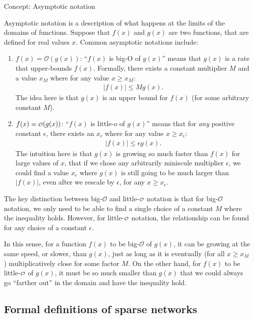 \begin{floatingbox}[h]\caption{Concept: Asymptotic notation}
\label{box:ch7:asy}
Asymptotic notation is a description of what happens at the limits of the domains of functions. Suppose that $f(x)$ and $g(x)$ are two functions, that are defined for real values $x$. Common asymptotic notations include:
\begin{enumerate}
    \item $f(x) = \mathcal O(g(x))$: ``$f(x)$ is big-O of $g(x)$'' means that $g(x)$ is a rate that upper-bounds $f(x)$. Formally, there exists a constant multiplier $M$ and a value $x_M$ where for any value $x \geq x_M$:
    \begin{align*}
        |f(x)| \leq Mg(x).
    \end{align*}
    The idea here is that $g(x)$ is an upper bound for $f(x)$ (for some arbitrary constant $M$).
    \item $f(x) = \smallO(g(x))$: ``$f(x)$ is little-o of $g(x)$'' means that for \textit{any} positive constant $\epsilon$, there exists an $x_\epsilon$ where for any value $x \geq x_\epsilon$:
    \begin{align*}
        |f(x)| \leq \epsilon g(x).
    \end{align*}
    The intuition here is that $g(x)$ is growing so much faster than $f(x)$ for large values of $x$, that if we chose any arbitrarily miniscule multiplier $\epsilon$, we could find a value $x_\epsilon$ where $g(x)$ is still going to be much larger than $|f(x)|$, even after we rescale by $\epsilon$, for any $x \geq x_{\epsilon}$.
\end{enumerate}
The key distinction between big-$\mathcal O$ and little-$\smallO$ notation is that for big-$\mathcal O$ notation, we only need to be able to find a single choice of a constant $M$ where the inequality holds. However, for little-$\smallO$ notation, the relationship can be found for any choice of a constant $\epsilon$. 

In this sense, for a function $f(x)$ to be big-$\mathcal O$ of $g(x)$, it can be growing at the same speed, or slower, than $g(x)$, just as long as it is eventually (for all $x \geq x_M$) multiplicatively close for some factor $M$. On the other hand, for $f(x)$ to be little-$\smallO$ of $g(x)$, it must be so much smaller than $g(x)$ that we could always go ``farther out'' in the domain and have the inequality hold.
\end{floatingbox}

\subsection{Formal definitions of sparse networks}

